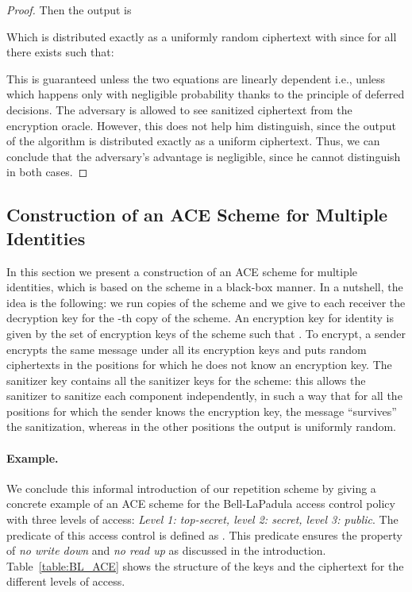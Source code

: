 \documentclass{llncs}
\begin{document}
\begin{proof}
Then the output  is

Which is distributed exactly as a uniformly random ciphertext  with  since for all  there exists  such that:

This is guaranteed unless the two equations are linearly dependent i.e., unless  which happens only with negligible probability thanks to the principle of deferred decisions.
The adversary is allowed to see sanitized ciphertext from the encryption oracle. However, this does not help him distinguish, since the output of the  algorithm is distributed exactly as a uniform ciphertext.
Thus, we can conclude that the adversary's advantage is negligible, since he cannot distinguish in both cases.
\end{proof}



\subsection{Construction of an ACE Scheme for Multiple Identities}

In this section we  present a construction of an ACE scheme for multiple identities, which is based on the \oACE scheme in a black-box manner. In a nutshell, the idea is the following: we run  copies of the \oACE scheme and we give to each receiver  the decryption key  for the -th copy of the scheme. An encryption key for identity  is given by the set of encryption keys  of the \oACE scheme such that . To encrypt, a sender encrypts the same message  under all its encryption keys  and puts random ciphertexts in the positions for which he does not know an encryption key. The sanitizer key contains all the sanitizer keys for the \oACE scheme: this allows the sanitizer to sanitize each component independently, in such a way that for all the positions for which the sender knows the encryption key, the message ``survives'' the sanitization, whereas in the other positions the output is uniformly random.

\paragraph{Example.} We conclude this informal introduction of our repetition scheme by giving a concrete example of an ACE scheme for the Bell-LaPadula access control policy with three levels of access: \textit{Level 1: top-secret, level 2: secret, level 3: public}.
The predicate of this access control is defined as . This predicate ensures the property of \textit{no write down} and \textit{no read up} as discussed in the introduction.
Table~\ref{table:BL_ACE} shows the structure of the keys and the ciphertext for the different levels of access.
\end{document}
